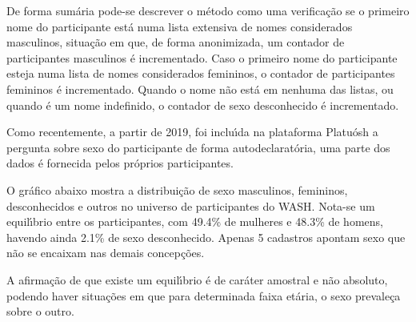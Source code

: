 \documentclass[
12pt,		%
openright,	%
twoside,  %
a4paper,			%
chapter=TITLE,		%
english,			%
french,				%
spanish,			%
brazil				%
]{USPSC-classe/USPSC}
\begin{document}
De forma sum\'aria pode-se descrever o m\'etodo como uma verifica\c{c}\~ao se o primeiro nome do participante est\'a numa lista extensiva de nomes \textquotedbl considerados masculinos\textquotedbl , situa\c{c}\~ao em que, de forma anonimizada, um contador de participantes masculinos \'e incrementado. Caso o primeiro nome do participante esteja numa lista de nomes \textquotedbl considerados femininos\textquotedbl , o contador de participantes femininos \'e incrementado. Quando o nome n\~ao est\'a em nenhuma das listas, ou quando \'e um nome indefinido, o contador de \textquotedbl sexo desconhecido \'e incrementado\textquotedbl .

















Como recentemente, a partir de 2019, foi inclu\'{\i}da na plataforma Platu\'osh a pergunta sobre sexo do participante de forma autodeclarat\'oria, uma parte dos dados \'e fornecida pelos pr\'oprios participantes.

















O gr\'afico abaixo mostra a distribui\c{c}\~ao de sexo masculinos, femininos, desconhecidos e outros no universo de participantes do WASH. Nota-se um equil\'{\i}brio entre os participantes, com 49.4\% de mulheres e 48.3\% de homens, havendo ainda 2.1\% de sexo desconhecido. Apenas 5 cadastros apontam sexo que n\~ao se encaixam nas demais concep\c{c}\~oes.

















A afirma\c{c}\~ao de que existe um equil\'{\i}brio \'e de car\'ater amostral e n\~ao absoluto, podendo haver situa\c{c}\~oes em que para determinada faixa et\'aria, o sexo prevale\c{c}a sobre o outro.
\end{document}
